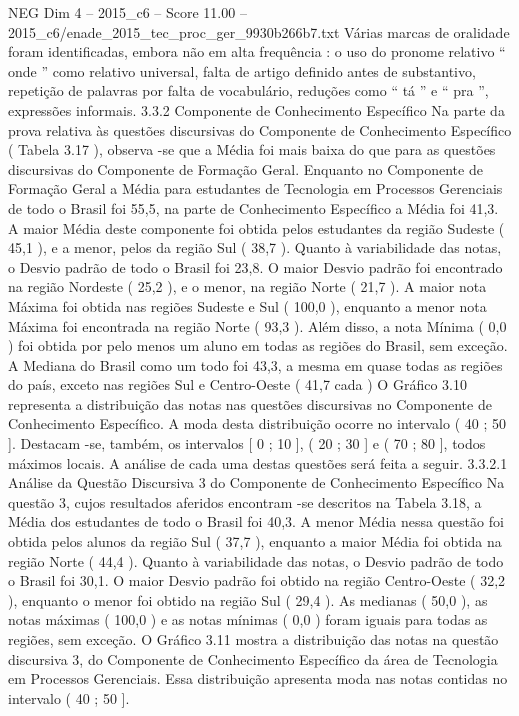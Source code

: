 \begin{textsample}{NEG Dim 4 – 2015\_c6 – Score 11.00 – 2015\_c6/enade\_2015\_tec\_proc\_ger\_9930b266b7.txt}
Várias marcas de oralidade foram identificadas, embora não em alta frequência : o uso do pronome relativo “ onde ” como relativo universal, falta de artigo definido antes de substantivo, repetição de palavras por falta de vocabulário, reduções como “ tá ” e “ pra ”, expressões informais. 3.3.2 Componente de Conhecimento Específico Na parte da prova relativa às questões discursivas do Componente de Conhecimento Específico ( Tabela 3.17 ), observa -se que a Média foi mais baixa do que para as questões discursivas do Componente de Formação Geral.
Enquanto no Componente de Formação Geral a Média para estudantes de Tecnologia em Processos Gerenciais de todo o Brasil foi 55,5, na parte de Conhecimento Específico a Média foi 41,3.
A maior Média deste componente foi obtida pelos estudantes da região Sudeste ( 45,1 ), e a menor, pelos da região Sul ( 38,7 ).
Quanto à variabilidade das notas, o Desvio padrão de todo o Brasil foi 23,8.
O maior Desvio padrão foi encontrado na região Nordeste ( 25,2 ), e o menor, na região Norte ( 21,7 ).
A maior nota Máxima foi obtida nas regiões Sudeste e Sul ( 100,0 ), enquanto a menor nota Máxima foi encontrada na região Norte ( 93,3 ).
Além disso, a nota Mínima ( 0,0 ) foi obtida por pelo menos um aluno em todas as regiões do Brasil, sem exceção.
A Mediana do Brasil como um todo foi 43,3, a mesma em quase todas as regiões do país, exceto nas regiões Sul e Centro-Oeste ( 41,7 cada ) O Gráfico 3.10 representa a distribuição das notas nas questões discursivas no Componente de Conhecimento Específico.
A moda desta distribuição ocorre no intervalo ( 40 ; 50 ].
Destacam -se, também, os intervalos [ 0 ; 10 ], ( 20 ; 30 ] e ( 70 ; 80 ], todos máximos locais.
A análise de cada uma destas questões será feita a seguir. 3.3.2.1 Análise da Questão Discursiva 3 do Componente de Conhecimento Específico Na questão 3, cujos resultados aferidos encontram -se descritos na Tabela 3.18, a Média dos estudantes de todo o Brasil foi 40,3.
A menor Média nessa questão foi obtida pelos alunos da região Sul ( 37,7 ), enquanto a maior Média foi obtida na região Norte ( 44,4 ).
Quanto à variabilidade das notas, o Desvio padrão de todo o Brasil foi 30,1.
O maior Desvio padrão foi obtido na região Centro-Oeste ( 32,2 ), enquanto o menor foi obtido na região Sul ( 29,4 ).
As medianas ( 50,0 ), as notas máximas ( 100,0 ) e as notas mínimas ( 0,0 ) foram iguais para todas as regiões, sem exceção.
O Gráfico 3.11 mostra a distribuição das notas na questão discursiva 3, do Componente de Conhecimento Específico da área de Tecnologia em Processos Gerenciais.
Essa distribuição apresenta moda nas notas contidas no intervalo ( 40 ; 50 ].

\end{textsample}
